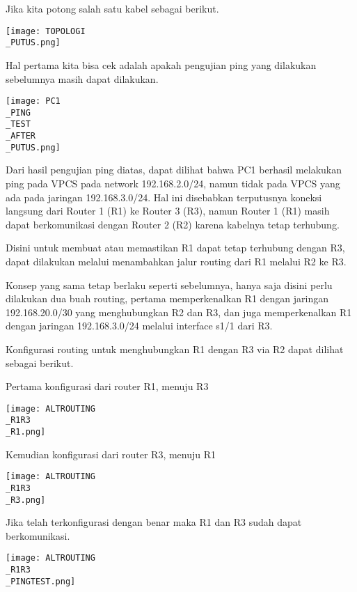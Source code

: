 \documentclass[12pt, a4paper]{article}
\begin{document}
  Jika kita potong salah satu kabel sebagai berikut.

  \begin{center}
    \texttt{[image: TOPOLOGI\\\_PUTUS.png]}
  \end{center}

  Hal pertama kita bisa cek adalah apakah pengujian ping yang dilakukan sebelumnya
  masih dapat dilakukan.

  \begin{center}
    \texttt{[image: PC1\\\_PING\\\_TEST\\\_AFTER\\\_PUTUS.png]}
  \end{center}

  Dari hasil pengujian ping diatas, dapat dilihat bahwa PC1 berhasil melakukan
  ping pada VPCS pada network 192.168.2.0/24, namun tidak pada VPCS yang
  ada pada jaringan 192.168.3.0/24. Hal ini disebabkan terputusnya koneksi langsung
  dari Router 1 (R1) ke Router 3 (R3), namun Router 1 (R1) masih dapat berkomunikasi
  dengan Router 2 (R2) karena kabelnya tetap terhubung.

  Disini untuk membuat atau memastikan R1 dapat tetap terhubung dengan R3, 
  dapat dilakukan melalui menambahkan jalur routing dari R1 melalui R2 ke R3.

  Konsep yang sama tetap berlaku seperti sebelumnya, hanya saja disini perlu 
  dilakukan dua buah routing, pertama memperkenalkan R1 dengan jaringan 
  192.168.20.0/30 yang menghubungkan R2 dan R3, dan juga memperkenalkan R1
  dengan jaringan 192.168.3.0/24 melalui interface s1/1 dari R3.

  Konfigurasi routing untuk menghubungkan R1 dengan R3 via R2 dapat dilihat
  sebagai berikut.

  Pertama konfigurasi dari router R1, menuju R3
  \begin{center}
    \texttt{[image: ALTROUTING\\\_R1R3\\\_R1.png]}
  \end{center}

  Kemudian konfigurasi dari router R3, menuju R1
  \begin{center}
    \texttt{[image: ALTROUTING\\\_R1R3\\\_R3.png]}
  \end{center}

  Jika telah terkonfigurasi dengan benar maka R1 dan R3 sudah dapat
  berkomunikasi.

  \begin{center}
    \texttt{[image: ALTROUTING\\\_R1R3\\\_PINGTEST.png]}
  \end{center}
\end{document}
